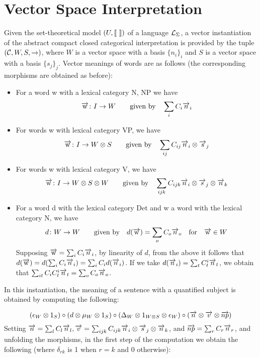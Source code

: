 \section{Vector Space  Interpretation}


Given the set-theoretical model $(U, [\![ \  ]\!])$ of a language ${\cal L}_{\Sigma}$, a   vector instantiation of the abstract compact closed categorical interpretation is  provided by the tuple $({\cal C}, W,S, \overrightarrow{\text{\ }})$, where $W$ is a vector space with a basis $\{n_i\}_i$ and $S$ is a vector space with a basis $\{s_j\}_j$.  Vector meanings of words are as follows (the corresponding morphisms are obtained as before): 

\begin{itemize}
\item For a word w with a lexical category N, NP we have  
\[
 \overrightarrow{\text{w}} \colon I \to W \qquad \mbox{given by} \quad  \sum_i C_i \overrightarrow{n}_i
\]
\item For words w with lexical category VP, we have
\[
 \overrightarrow{\text{w}}  \colon I \to W \otimes S \qquad \mbox{given by} \quad  \sum_{ij} C_{ij} \overrightarrow{n}_i \otimes \overrightarrow{s}_j 
\]
\item For words w with lexical category V, we have
\[
\overrightarrow{\text{w}}  \colon I \to W \otimes S \otimes W \qquad \mbox{given by} \quad   \sum_{ijk} C_{ijk} \overrightarrow{n}_i \otimes \overrightarrow{s}_j \otimes \overrightarrow{n}_k
\]
\item For a word d with the lexical category Det and w a word with the lexical category N, we have 
\[
 d \colon W \to W \qquad \mbox{given by} \quad d(\overrightarrow{\text {w}})  = \sum_o C_o \overrightarrow{n}_o \quad \text{for} \quad \overrightarrow{\text{w}} \in W
\]
Supposing $\overrightarrow{\text{w}} =  \sum_i  C_i \overrightarrow{n}_i$, by linearity of $d$, from the above it follows that  $d(\overrightarrow{\text {w}})  =  d(\sum_i  C_i \overrightarrow{n}_i) = \sum_i C_i d(\overrightarrow{n}_i)$.  If we take $d(\overrightarrow{n}_i) = \sum_t C^i_t \overrightarrow{n}_t$, we obtain  that $\sum_{it} C_i C^i_t \overrightarrow{n}_t =  \sum_o C_o \overrightarrow{n}_o$. 
\end{itemize}

\noindent
In this instantiation, the  meaning of  a sentence with a quantified subject  is obtained by computing the following:

\[
(\epsilon_W \otimes 1_S) \circ (d \otimes  \mu_W \otimes 1_S) \circ (\Delta_W \otimes 1_{W \otimes S} \otimes \epsilon_W)  \circ (\overrightarrow{{n}} \otimes \overrightarrow{{v}} \otimes \overrightarrow{{np}})
\]
Setting $\overrightarrow{{n}} = \sum_l C_l \overrightarrow{n}_l, \overrightarrow{{v}} = \sum_{ijk} C_{ijk} \overrightarrow{n}_i \otimes \overrightarrow{s}_j \otimes \overrightarrow{n}_k$, and $\overrightarrow{{np}} = \sum_r C_r \overrightarrow{n}_r$, and   unfolding the morphisms, in the first step of the computation we obtain the following (where $\delta_{rk}$ is 1 when $r=k$ and 0 otherwise):

